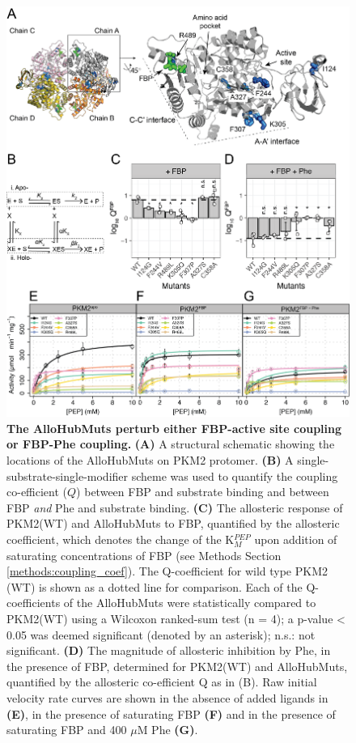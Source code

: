 \begin{figure}[!ht]
\includegraphics[scale=0.6]{ch7_fig6_apo_fbp_rate_curves.png}
\caption[The AlloHubMuts perturb either FBP-active site coupling or FBP-Phe coupling.] {\textbf{The AlloHubMuts perturb either FBP-active site coupling or FBP-Phe coupling.} \textbf{(A)} A structural schematic showing the locations of the AlloHubMuts on PKM2 protomer. \textbf{(B)} A single-substrate-single-modifier scheme was used to quantify the coupling co-efficient ($Q$) between FBP and substrate binding and between FBP \textit{and} Phe and substrate binding. \textbf{(C)} The allosteric response of PKM2(WT) and AlloHubMuts to FBP, quantified by the allosteric coefficient, which denotes the change of the K$_{M}^{PEP}$ upon addition of saturating concentrations of FBP (see Methods Section \ref{methods:coupling_coef}). The Q-coefficient for wild type PKM2 (WT) is shown as a dotted line for comparison. Each of the Q-coefficients of the AlloHubMuts were statistically compared to PKM2(WT) using a Wilcoxon ranked-sum test (n = 4); a p-value < 0.05 was deemed significant (denoted by an asterisk); n.s.: not significant. \textbf{(D)} The magnitude of allosteric inhibition by Phe, in the presence of FBP, determined for PKM2(WT) and AlloHubMuts, quantified by the allosteric co-efficient Q as in (B). Raw initial velocity rate curves are shown in the absence of added ligands in \textbf{(E)}, in the presence of saturating FBP \textbf{(F)} and in the presence of saturating FBP and 400 $\mu$M Phe \textbf{(G)}.}
\label{fig:fbp_coupling_constant}
\end{figure}
